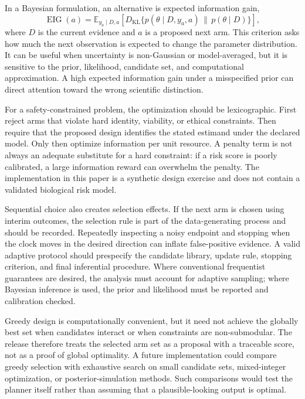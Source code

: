 \documentclass[10pt,a4paper]{article}
\begin{document}
In a Bayesian formulation, an alternative is expected information gain,
\[
\operatorname{EIG}(a)=
\mathbb E_{y_a\mid D,a}\!\left[
D_{\mathrm{KL}}\{p(\theta\mid D,y_a,a)\,\|\,p(\theta\mid D)\}
\right],
\]
where \(D\) is the current evidence and \(a\) is a proposed next arm. This criterion asks how much the next observation is expected to change the parameter distribution. It can be useful when uncertainty is non-Gaussian or model-averaged, but it is sensitive to the prior, likelihood, candidate set, and computational approximation. A high expected information gain under a misspecified prior can direct attention toward the wrong scientific distinction.

For a safety-constrained problem, the optimization should be lexicographic. First reject arms that violate hard identity, viability, or ethical constraints. Then require that the proposed design identifies the stated estimand under the declared model. Only then optimize information per unit resource. A penalty term is not always an adequate substitute for a hard constraint: if a risk score is poorly calibrated, a large information reward can overwhelm the penalty. The implementation in this paper is a synthetic design exercise and does not contain a validated biological risk model.

Sequential choice also creates selection effects. If the next arm is chosen using interim outcomes, the selection rule is part of the data-generating process and should be recorded. Repeatedly inspecting a noisy endpoint and stopping when the clock moves in the desired direction can inflate false-positive evidence. A valid adaptive protocol should prespecify the candidate library, update rule, stopping criterion, and final inferential procedure. Where conventional frequentist guarantees are desired, the analysis must account for adaptive sampling; where Bayesian inference is used, the prior and likelihood must be reported and calibration checked.

Greedy design is computationally convenient, but it need not achieve the globally best set when candidates interact or when constraints are non-submodular. The release therefore treats the selected arm set as a proposal with a traceable score, not as a proof of global optimality. A future implementation could compare greedy selection with exhaustive search on small candidate sets, mixed-integer optimization, or posterior-simulation methods. Such comparisons would test the planner itself rather than assuming that a plausible-looking output is optimal.
\end{document}
